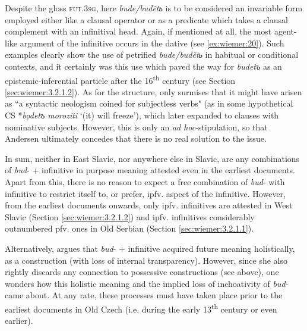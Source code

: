 \documentclass[output=paper,colorlinks,citecolor=brown]{langscibook}
\begin{document}
Despite the gloss \textsc{fut.3sg}, here \textit{bude/budětь} is to be considered an invariable form employed either like a clausal operator or as a predicate which takes a clausal complement with an infinitival head. Again, if mentioned at all, the most agent-like argument of the infinitive occurs in the dative (see \ref{ex:wiemer:20}). Such examples clearly show the use of petrified \textit{bude/budětь }in habitual or conditional contexts, and it certainly was this use which paved the way for \textit{budetъ} as an epistemic-inferential particle after the 16\textsuperscript{th} century (see Section \ref{sec:wiemer:3.2.1.2}). As for the structure, \citet[32, 35]{andersen_2006b} only surmises that it might have arisen as ``a syntactic neologism coined for subjectless verbs" (as in some hypothetical CS *\textit{bǫdetъ moroziti }‘(it) will freeze’), which later expanded to clauses with nominative subjects. However, this is only an \textit{ad hoc}-stipulation, so that Andersen ultimately concedes that there is no real solution to the issue.

In sum, neither in East Slavic, nor anywhere else in Slavic, are any combinations of \textit{bud}- + infinitive in purpose meaning attested even in the earliest documents. Apart from this, there is no reason to expect a free combination of \textit{bud}- with infinitive to restrict itself to, or prefer, ipfv. aspect of the infinitive. However, from the earliest documents onwards, only ipfv. infinitives are attested in West Slavic (Section \ref{sec:wiemer:3.2.1.2}) and ipfv. infinitives considerably outnumbered pfv. ones in Old Serbian (Section \ref{sec:wiemer:3.2.1.1}).

Alternatively, \citet[98]{Křížková1960} argues that \textit{bud}- + infinitive acquired future meaning holistically, as a construction (with loss of internal transparency). However, since she also rightly discards any connection to possessive constructions (see above), one wonders how this holistic meaning and the implied loss of inchoativity of\textit{ bud}- came about. At any rate, these processes must have taken place prior to the earliest documents in Old Czech (i.e. during the early 13\textsuperscript{th} century or even earlier).
\end{document}
